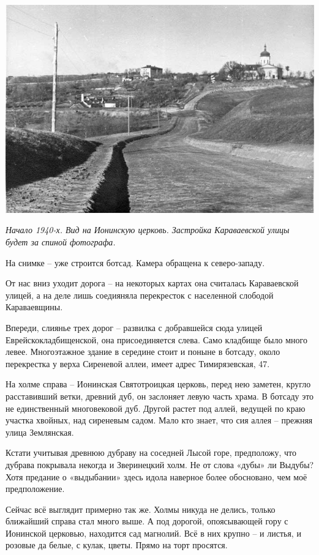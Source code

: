 \begin{center}
\includegraphics[width=\linewidth]{chast-vosp/zver/karavaevskaya.jpg}

\textit{Начало 1940-х. Вид на Ионинскую церковь. Застройка Караваевской улицы будет за спиной фотографа.}
\end{center}

На снимке – уже строится ботсад. Камера обращена к северо-западу. 

От нас вниз уходит дорога – на некоторых картах она считалась Караваевской улицей, а на деле лишь соедияняла перекресток с населенной слободой Караваевщины.

Впереди, слиянье трех дорог – развилка с добравшейся сюда улицей Еврейскокладбищенской, она присоединяется слева. Само кладбище было много левее. Многоэтажное здание в середине стоит и поныне в ботсаду, около перекрестка у верха Сиреневой аллеи, имеет адрес Тимирязевская, 47.

На холме справа – Ионинская Святотроицкая церковь, перед нею заметен, кругло расставивший ветки, древний дуб, он заслоняет левую часть храма. В ботсаду это не единственный многовековой дуб. Другой растет под аллей, ведущей по краю участка хвойных, над сиреневым садом. Мало кто знает, что сия аллея – прежняя улица Землянская.

Кстати учитывая древнюю дубраву на соседней Лысой горе, предположу, что дубрава покрывала некогда и Зверинецкий холм. Не от слова «дубы» ли Выдубы? Хотя предание о «выдыбании» здесь идола наверное более обосновано, чем моё предположение.

Сейчас всё выглядит примерно так же. Холмы никуда не делись, только ближайший справа стал много выше. А под дорогой, опоясывающей гору с Ионинской церковью, находится сад магнолий. Всё в них крупно – и листья, и розовые да белые, с кулак, цветы. Прямо на торт просятся.

